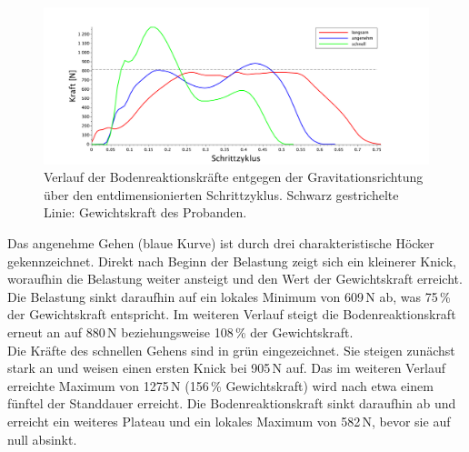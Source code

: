 \begin{figure}[h!]
	\centering
	\includegraphics[width=1\linewidth]{bilder/ergebnisse/Forces_df_plusbw.pdf}
	\caption[Bodenreaktionskräfte]{Verlauf der Bodenreaktionskräfte entgegen der Gravitationsrichtung über den entdimensionierten Schrittzyklus. Schwarz gestrichelte Linie: Gewichtskraft des Probanden.}
	\label{fig:grf}
\end{figure}

Das angenehme Gehen (blaue Kurve) ist durch drei charakteristische Höcker gekennzeichnet. Direkt nach Beginn der Belastung zeigt sich ein kleinerer Knick, woraufhin die Belastung weiter ansteigt und den Wert der Gewichtskraft erreicht. Die Belastung sinkt daraufhin auf ein lokales Minimum von 609\,N ab, was 75\,\% der Gewichtskraft entspricht. Im weiteren Verlauf steigt die Bodenreaktionskraft erneut an auf 880\,N beziehungsweise 108\,\% der Gewichtskraft. \\
Die Kräfte des schnellen Gehens sind in grün eingezeichnet. Sie steigen zunächst stark an und weisen einen ersten Knick bei 905\,N auf. Das im weiteren Verlauf erreichte Maximum von 1275\,N (156\,\% Gewichtskraft) wird nach etwa einem fünftel der Standdauer erreicht. Die Bodenreaktionskraft sinkt daraufhin ab und erreicht ein weiteres Plateau und ein lokales Maximum von 582\,N, bevor sie auf null absinkt.\\

